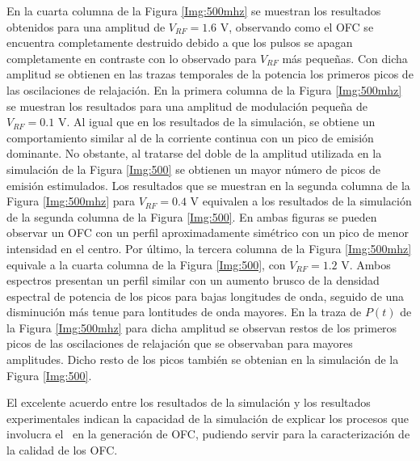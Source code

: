 		En la cuarta columna de la Figura \ref{Img:500mhz} se muestran los resultados obtenidos para una amplitud de $V_{RF} = 1.6$ V, observando como el OFC se encuentra completamente destruido debido a que los pulsos se apagan completamente en contraste con lo observado para $V_{RF}$ más pequeñas. Con dicha amplitud se obtienen en las trazas temporales de la potencia los primeros picos de las oscilaciones de relajaci\'on. En la primera columna de la Figura \ref{Img:500mhz} se muestran los resultados para una amplitud de modulación pequeña de $V_{RF} = 0.1$ V. Al igual que en los resultados de la simulación, se obtiene un comportamiento similar al de la corriente continua con un pico de emisi\'on dominante. No obstante, al tratarse del doble de la amplitud utilizada en la simulaci\'on de la Figura \ref{Img:500} se obtienen un mayor n\'umero de picos de emisión estimulados. Los resultados que se muestran en la segunda columna de la Figura \ref{Img:500mhz}  para $V_{RF} = 0.4$ V equivalen a los resultados de la simulación de la segunda columna de la Figura \ref{Img:500}. En ambas figuras se pueden observar un OFC con un perfil aproximadamente sim\'etrico con un pico de menor intensidad en el centro. Por \'ultimo, la tercera columna de la Figura \ref{Img:500mhz} equivale a la cuarta columna de la Figura \ref{Img:500}, con $V_{RF} = 1.2$ V. Ambos espectros presentan un perfil similar con un aumento brusco de la densidad espectral de potencia de los picos para bajas longitudes de onda, seguido de una disminuci\'on m\'as tenue para lontitudes de onda mayores. En la traza de $P(t)$ de la Figura \ref{Img:500mhz} para dicha amplitud se observan restos de los primeros picos de las oscilaciones de relajaci\'on que se observaban para mayores amplitudes. Dicho resto de los picos tambi\'en se obtenian en la simulaci\'on de la Figura \ref{Img:500}.

	El excelente acuerdo entre los resultados de la simulaci\'on y los resultados experimentales \cite{artSim,Chaves19,rosado2018experimental} indican la capacidad de la simulaci\'on de explicar los procesos que involucra el \gs\ en la generaci\'on de OFC, pudiendo servir para la caracterizaci\'on de la calidad de los OFC.
